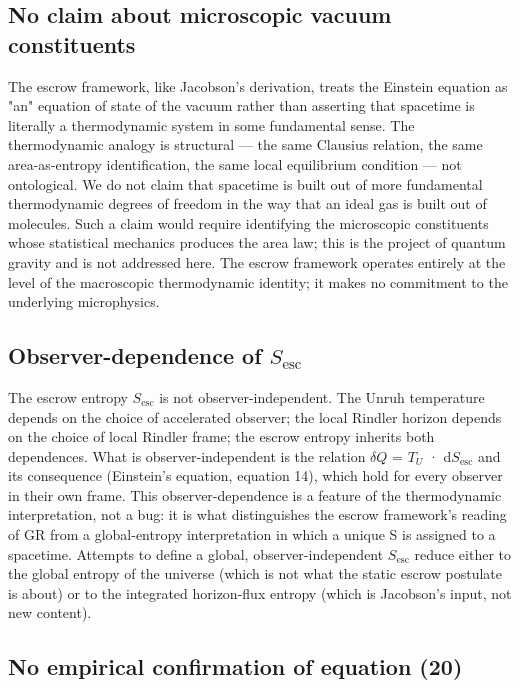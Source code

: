 \documentclass[11pt]{article}
\begin{document}
\subsection{No claim about microscopic vacuum constituents}

The escrow framework, like Jacobson's derivation, treats the Einstein
equation as "an" equation of state of the vacuum rather than asserting
that spacetime is literally a thermodynamic system in some fundamental
sense. The thermodynamic analogy is structural --- the same Clausius
relation, the same area-as-entropy identification, the same local
equilibrium condition --- not ontological. We do not claim that
spacetime is built out of more fundamental thermodynamic degrees of
freedom in the way that an ideal gas is built out of molecules. Such a
claim would require identifying the microscopic constituents whose
statistical mechanics produces the area law; this is the project of
quantum gravity and is not addressed here. The escrow framework operates
entirely at the level of the macroscopic thermodynamic identity; it
makes no commitment to the underlying microphysics.


\subsection{Observer-dependence of $S_{\mathrm{esc}}$}

The escrow entropy $S_{\mathrm{esc}}$ is not observer-independent. The Unruh
temperature depends on the choice of accelerated observer; the local
Rindler horizon depends on the choice of local Rindler frame; the escrow
entropy inherits both dependences. What is observer-independent is the
relation $\delta Q$ = $T_{U}$ · d$S_{\mathrm{esc}}$ and its consequence (Einstein's equation,
equation 14), which hold for every observer in their own frame. This
observer-dependence is a feature of the thermodynamic interpretation,
not a bug: it is what distinguishes the escrow framework's reading of
GR from a global-entropy interpretation in which a unique S is assigned
to a spacetime. Attempts to define a global, observer-independent $S_{\mathrm{esc}}$
reduce either to the global entropy of the universe (which is not what
the static escrow postulate is about) or to the integrated horizon-flux
entropy (which is Jacobson's input, not new content).


\subsection{No empirical confirmation of equation (20)}
\end{document}
